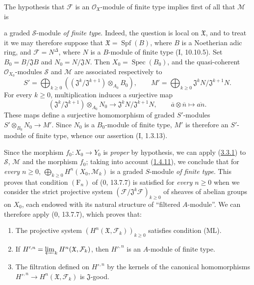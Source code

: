 The hypothesis that $\mathcal F$ is an $\mathcal O_{\mathfrak X}$-module of
finite type implies first of all that $\mathcal M$ is

a graded $\mathcal S$-module \emph{of finite type}. Indeed, the question is
local on $\mathfrak X$, and to treat it we may therefore suppose that
$\mathfrak X=\operatorname{Spf}(B)$, where $B$ is a Noetherian adic ring,
and $\mathcal F=N^\Delta$, where $N$ is a $B$-module of finite type
(I, 10.10.5). Set $B_0=B/\mathfrak J B$ and $N_0=N/\mathfrak JN$.
Then $X_0=\operatorname{Spec}(B_0)$, and the
quasi-coherent $\mathcal O_{X_0}$-modules $\mathcal S$ and $\mathcal M$
are associated respectively to
\[
S'=\bigoplus_{k\geq0}
((\mathfrak J^k/\mathfrak J^{k+1})\otimes_{A_0}B_0),\qquad
M'=\bigoplus_{k\geq0}\mathfrak J^kN/\mathfrak J^{k+1}N.
\]
For every $k\geq0$, multiplication induces a surjective map
\[
(\mathfrak J^k/\mathfrak J^{k+1})\otimes_{A_0}N_0
\longrightarrow\mathfrak J^kN/\mathfrak J^{k+1}N,
\qquad \overline a\otimes\overline n\longmapsto\overline{an}.
\]
These maps define a surjective homomorphism of graded
$S'$-modules $S'\otimes_{B_0}N_0\longrightarrow M'$.
Since $N_0$ is a $B_0$-module of finite type, $M'$ is therefore an
$S'$-module of finite type, whence our assertion (I, 1.3.13).

Since the morphism $f_0:X_0\to Y_0$ is \emph{proper} by hypothesis, we can
apply (\hyperref[III.3.3.1]{3.3.1}) to $\mathcal S$, $\mathcal M$ and the
morphism $f_0$; taking into account (\hyperref[III.1.4.11]{1.4.11}), we
conclude that for \emph{every $n\geq0$},
$\bigoplus_{k\geq0}H^n(X_0,\mathcal M_k)$ is a graded $S$-module \emph{of
finite type}. This proves that condition $(\mathrm F_n)$ of (0, 13.7.7) is
satisfied for \emph{every $n\geq0$} when we consider the strict projective
system $(\mathcal F/\mathfrak J^k\mathcal F)_{k\geq0}$ of sheaves of
abelian groups on $X_0$, each endowed with its natural structure of
``filtered $A$-module''. We can therefore apply (0, 13.7.7), which proves that:
\begin{enumerate}
\item[$1^\circ$] The projective system
$(H^n(\mathfrak X,\mathcal F_k))_{k\geq0}$ satisfies condition (ML).
\item[$2^\circ$] If
$H'^{,n}=\varprojlim_kH^n(\mathfrak X,\mathcal F_k)$, then $H'^{,n}$ is an
$A$-module of finite type.
\item[$3^\circ$] The filtration defined on $H'^{,n}$ by the kernels of the
canonical homomorphisms $H'^{,n}\to H^n(\mathfrak X,\mathcal F_k)$ is
$\mathfrak J$-good.
\end{enumerate}

